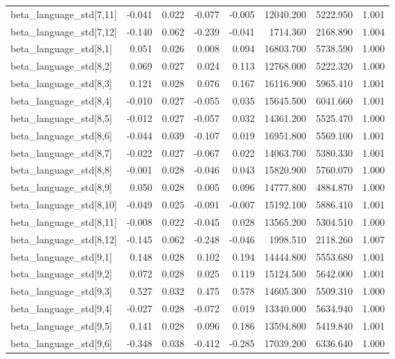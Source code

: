 \begin{tabular}{lrrrrrrr}
beta\_language\_std[7,11] & -0.041 & 0.022 & -0.077 & -0.005 & 12040.200 & 5222.950 & 1.001 \\
beta\_language\_std[7,12] & -0.140 & 0.062 & -0.239 & -0.041 & 1714.360 & 2168.890 & 1.004 \\
beta\_language\_std[8,1] & 0.051 & 0.026 & 0.008 & 0.094 & 16803.700 & 5738.590 & 1.000 \\
beta\_language\_std[8,2] & 0.069 & 0.027 & 0.024 & 0.113 & 12768.000 & 5222.320 & 1.000 \\
beta\_language\_std[8,3] & 0.121 & 0.028 & 0.076 & 0.167 & 16116.900 & 5965.410 & 1.001 \\
beta\_language\_std[8,4] & -0.010 & 0.027 & -0.055 & 0.035 & 15645.500 & 6041.660 & 1.001 \\
beta\_language\_std[8,5] & -0.012 & 0.027 & -0.057 & 0.032 & 14361.200 & 5525.470 & 1.000 \\
beta\_language\_std[8,6] & -0.044 & 0.039 & -0.107 & 0.019 & 16951.800 & 5569.100 & 1.001 \\
beta\_language\_std[8,7] & -0.022 & 0.027 & -0.067 & 0.022 & 14063.700 & 5380.330 & 1.001 \\
beta\_language\_std[8,8] & -0.001 & 0.028 & -0.046 & 0.043 & 15820.900 & 5760.070 & 1.000 \\
beta\_language\_std[8,9] & 0.050 & 0.028 & 0.005 & 0.096 & 14777.800 & 4884.870 & 1.000 \\
beta\_language\_std[8,10] & -0.049 & 0.025 & -0.091 & -0.007 & 15192.100 & 5886.410 & 1.001 \\
beta\_language\_std[8,11] & -0.008 & 0.022 & -0.045 & 0.028 & 13565.200 & 5304.510 & 1.000 \\
beta\_language\_std[8,12] & -0.145 & 0.062 & -0.248 & -0.046 & 1998.510 & 2118.260 & 1.007 \\
beta\_language\_std[9,1] & 0.148 & 0.028 & 0.102 & 0.194 & 14444.800 & 5553.680 & 1.001 \\
beta\_language\_std[9,2] & 0.072 & 0.028 & 0.025 & 0.119 & 15124.500 & 5642.000 & 1.001 \\
beta\_language\_std[9,3] & 0.527 & 0.032 & 0.475 & 0.578 & 14605.300 & 5509.310 & 1.000 \\
beta\_language\_std[9,4] & -0.027 & 0.028 & -0.072 & 0.019 & 13340.000 & 5634.940 & 1.000 \\
beta\_language\_std[9,5] & 0.141 & 0.028 & 0.096 & 0.186 & 13594.800 & 5419.840 & 1.001 \\
beta\_language\_std[9,6] & -0.348 & 0.038 & -0.412 & -0.285 & 17039.200 & 6336.640 & 1.000 \\

\end{tabular}
